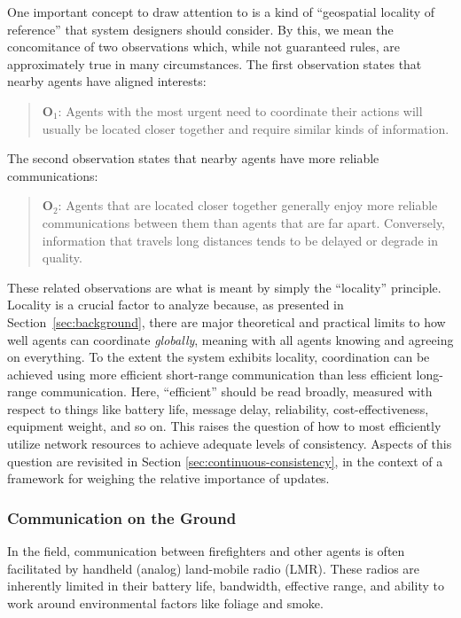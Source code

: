 \documentclass[]             %
{NASA}                       %
\theoremstyle{definition}
\begin{document}
One important concept to draw attention to is a kind of ``geospatial
locality of reference'' that system designers should consider. By
this, we mean the concomitance of two observations which, while not
guaranteed rules, are approximately true in many circumstances. The
first observation states that nearby agents have aligned interests:
\begin{quote}
  $\textbf{O}_1$: Agents with the most urgent need to coordinate their
  actions will usually be located closer together and require similar
  kinds of information.
\end{quote}
The second observation states that nearby agents have more reliable
communications:
\begin{quote}
  $\textbf{O}_2$: Agents that are located closer together generally
  enjoy more reliable communications between them than agents that are
  far apart. Conversely, information that travels long distances tends to
  be delayed or degrade in quality.
\end{quote}

These related observations are what is meant by simply the
``locality'' principle. Locality is a crucial factor to analyze
because, as presented in Section~\ref{sec:background}, there are major
theoretical and practical limits to how well agents can coordinate
\emph{globally}, meaning with all agents knowing and agreeing on
everything. To the extent the system exhibits locality, coordination
can be achieved using more efficient short-range communication than
less efficient long-range communication. Here, ``efficient'' should be
read broadly, measured with respect to things like battery life,
message delay, reliability, cost-effectiveness, equipment weight, and
so on. This raises the question of how to most efficiently utilize
network resources to achieve adequate levels of consistency. Aspects
of this question are revisited in Section
\ref{sec:continuous-consistency}, in the context of a framework for
weighing the relative importance of updates.

\subsubsection{Communication on the Ground}
\label{sssec:ground-communication}
In the field, communication between firefighters and other agents is
often facilitated by handheld (analog) land-mobile radio (LMR). These
radios are inherently limited in their battery life, bandwidth,
effective range, and ability to work around environmental factors like
foliage and smoke.
\end{document}
